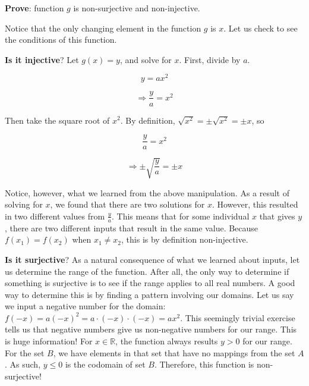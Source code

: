 \textbf{Prove}: function $g$ is non-surjective and non-injective.



Notice that the only changing element in the function $g$ is $x$. Let us check to see the
conditions of this function.



\textbf{Is it injective}? Let $g(x)=y$, and solve for $x$. First, divide by $a$.



$$y=ax^{2}$$



$$\Rightarrow \frac{y}{a}=x^{2}$$



Then take the square root of $x^2$. By definition, $\sqrt{x^{2}}=\pm\sqrt{x^{2}}=\pm x$, so



$$\frac{y}{a}=x^{2}$$



$$\Rightarrow\pm\sqrt{\frac{y}{a}}=\pm x$$



Notice, however, what we learned from the above manipulation. As a result of solving for
$x$, we found that there are two solutions for $x$. However, this resulted in two
different values from $\frac{y}{a}$. This means that for some individual $x$ that gives
$y$, there are two different inputs that result in the same value. Because $f(x _{1})=f(x
_{2})$ when $x _{1}\ne x _{2}$, this is by definition non-injective.



\textbf{Is it surjective}? As a natural consequence of what we learned about inputs, let us determine the range of the function. After all, the only way to determine if something is surjective is to see if the range applies to all real numbers. A good way to determine this is by finding a pattern involving our domains. Let us say we input a negative number for the domain: $f(-x)=a(-x)^{2}=a\cdot(-x)\cdot(-x)=ax^2$. This seemingly trivial exercise tells us that negative numbers give us non-negative numbers for our range. This is huge information! For $x\in\mathbb{R}$, the function always results $y>0$ for our range. For the set $B$, we have elements in that set that have no mappings from the set $A$. As such, $y\le0$ is the codomain of set $B$. Therefore, this function is non-surjective!






